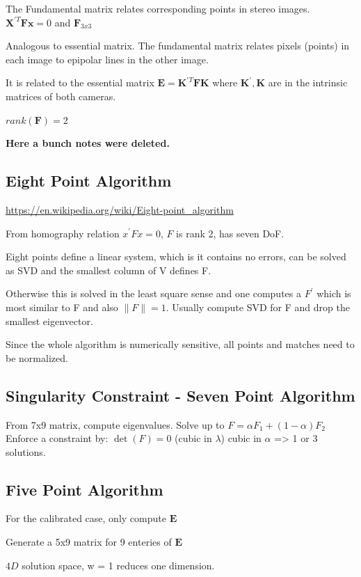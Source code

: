 The Fundamental matrix relates corresponding points in stereo images.
$\mathbf{X}^{\prime T}\mathbf{Fx}=0$ and $\mathbf{F}_{3x3}$

Analogous to essential matrix. The fundamental matrix relates pixels (points) in each image to epipolar lines in the other image.

It is related to the essential matrix $\mathbf{E} = \mathbf{K}^{\prime T} \mathbf{FK}$ where $\mathbf{K}^{\prime}, \mathbf{K}$ are in the intrinsic matrices of both cameras.

$rank(\mathbf{F}) = 2$

\textbf{Here a bunch notes were deleted.}

\subsection{Eight Point Algorithm}

\url{https://en.wikipedia.org/wiki/Eight-point_algorithm}

From homography relation $x^\prime F x = 0$, $F$ is rank 2, has seven DoF. 

Eight points define a linear system, which is it contains no errors, can be solved as SVD and the smallest column of V defines F.

Otherwise this is solved in the least square sense and one computes a $F^\prime$ which is most similar to F and also $\|F\|=1$. Usually compute SVD for F and drop the smallest eigenvector. 

Since the whole algorithm is numerically sensitive, all points and matches need to be normalized. 

\subsection{Singularity Constraint - Seven Point Algorithm}
From 7x9 matrix, compute eigenvalues.
Solve up to $F = \alpha F_1 + (1-\alpha) F_2$
Enforce a constraint by: $\det(F) = 0$ (cubic in $\lambda$)
cubic in $\alpha$ => 1 or 3 solutions.

\subsection{Five Point Algorithm}

For the calibrated case, only compute $\mathbf{E}$

Generate a 5x9 matrix for 9 enteries of $\mathbf{E}$

$4D$ solution space, w = 1 reduces one dimension.

